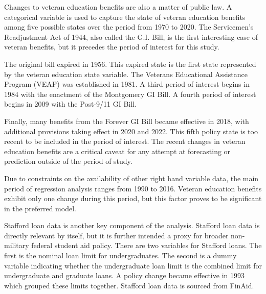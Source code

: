\documentclass[review]{elsarticle}
\begin{document}
    Changes to veteran education benefits are also a matter of public law.
    A categorical variable is used to capture the state of veteran education benefits among five possible states over the period from 1970 to 2020.
    The Servicemen's Readjustment Act of 1944,
    also called the G.I. Bill,
    is the first interesting case of veteran benefits,
    but it precedes the period of interest for this study.

    The original bill expired in 1956\cite{glass_2010}.
    This expired state is the first state represented by the veteran education state variable.
    The Veterans Educational Assistance Program (VEAP) was established in 1981\cite{veteransaffairs_2017}.
    A third period of interest begins in 1984 with the enactment of the Montgomery GI Bill\cite{powers_2018}.
    A fourth period of interest begins in 2009 with the Post-9/11 GI Bill.

    Finally, many benefits from the Forever GI Bill became effective in 2018,
    with additional provisions taking effect in 2020 and 2022\cite{veteransaffairs_2020}.
    This fifth policy state is too recent to be included in the period of interest.
    The recent changes in veteran education benefits are a critical caveat for any attempt at forecasting or prediction outside of the period of study.

    Due to constraints on the availability of other right hand variable data,
    the main period of regression analysis ranges from 1990 to 2016.
    Veteran education benefits exhibit only one change during this period,
    but this factor proves to be significant in the preferred model.

    Stafford loan data is another key component of the analysis.
    Stafford loan data is directly relevant by itself,
    but it is further intended a proxy for broader non-military federal student aid policy.
    There are two variables for Stafford loans.
    The first is the nominal loan limit for undergraduates.
    The second is a dummy variable indicating whether the undergraduate loan limit
    is the combined limit for undergraduate and graduate loans.
    A policy change became effective in 1993 which grouped these limits together.
    Stafford loan data is sourced from FinAid\cite{finaid_2020}.
\end{document}
